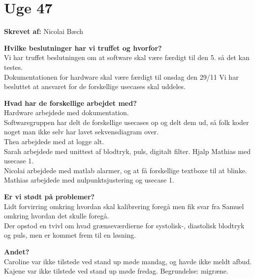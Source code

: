 \section{Uge 47}

\textbf{Skrevet af:}
Nicolai Bæch

\textbf{Hvilke beslutninger har vi truffet og hvorfor?} \\
Vi har truffet beslutningen om at software skal være færdigt til den 5. så det kan testes. \\
Dokumentationen for hardware skal være færdigt til onsdag den 29/11 Vi har besluttet at ansvaret for de forskellige usecases skal uddeles.

\textbf{Hvad har de forskellige arbejdet med?}\\
Hardware arbejdede med dokumentation. \\
Softwaregruppen har delt de forskellige usecases op og delt dem ud, så folk koder noget man ikke selv har lavet sekvensdiagram over. \\ Thea arbejdede med at logge alt. \\
Sarah arbejdede med unittest af blodtryk, puls, digitalt filter. Hjalp Mathias med usecase 1. \\
Nicolai arbejdede med matlab alarmer, og at få forskellige textboxe til at blinke. \\
Mathias arbejdede med nulpunktsjustering og usecase 1.

\textbf{Er vi stødt på problemer?}\\
Lidt forvirring omkring hvordan skal kalibrering foregå men fik svar fra Samuel omkring hvordan det skulle foregå. \\
Der opstod en tvivl om hvad grænseværdierne for systolisk-, diastolisk blodtryk og puls, men er kommet frem til en løsning.

\textbf{Andet?} \\
Caroline var ikke tilstede ved stand up møde mandag, og havde ikke meldt afbud. \\
Kajene var ikke tilstede ved stand up møde fredag. Begrundelse: migræne. 

\clearpage
